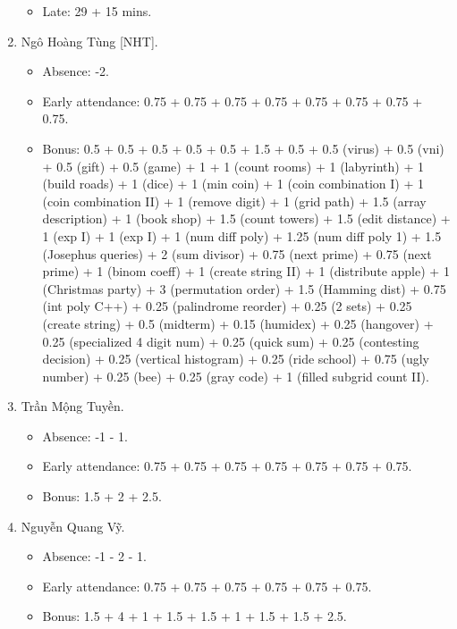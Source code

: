 \documentclass{article}
\begin{document}
\begin{enumerate}
\begin{itemize}
		\item Late: 29 + 15 mins.
	\end{itemize}
	\item {\sc Ngô Hoàng Tùng [NHT].}
	\begin{itemize}
        \item Absence: -2.
		\item Early attendance: 0.75 + 0.75 + 0.75 + 0.75 + 0.75 + 0.75 + 0.75 + 0.75.
		\item Bonus: 0.5 + 0.5 + 0.5 + 0.5 + 0.5 + 1.5 + 0.5 + 0.5 (virus) + 0.5 (vni) + 0.5 (gift) + 0.5 (game) + 1 + 1 (count rooms) + 1 (labyrinth) + 1 (build roads) + 1 (dice) + 1 (min coin) + 1 (coin combination I) + 1 (coin combination II) + 1 (remove digit) + 1 (grid path) + 1.5 (array description) + 1 (book shop) + 1.5 (count towers) + 1.5 (edit distance) + 1 (exp I) + 1 (exp I) + 1 (num diff poly) + 1.25 (num diff poly 1) + 1.5 (Josephus queries) + 2 (sum divisor) + 0.75 (next prime) + 0.75 (next prime) + 1 (binom coeff) + 1 (create string II) + 1 (distribute apple) + 1 (Christmas party) + 3 (permutation order) + 1.5 (Hamming dist) + 0.75 (int poly C++) + 0.25 (palindrome reorder) + 0.25 (2 sets) + 0.25 (create string) + 0.5 (midterm) + 0.15 (humidex) + 0.25 (hangover) + 0.25 (specialized 4 digit num) + 0.25 (quick sum)  + 0.25 (contesting decision) + 0.25 (vertical histogram) + 0.25 (ride school) + 0.75 (ugly number) + 0.25 (bee) + 0.25 (gray code) + 1 (filled subgrid count II).
	\end{itemize}
	\item {\sc Trần Mộng Tuyền.}
	\begin{itemize}
		\item Absence: -1 - 1.
		\item Early attendance: 0.75 + 0.75 + 0.75 + 0.75 + 0.75 + 0.75 + 0.75.
        \item Bonus: 1.5 + 2 + 2.5.
	\end{itemize}
	\item {\sc Nguyễn Quang Vỹ.}
	\begin{itemize}
		\item Absence: -1 - 2 - 1.
		\item Early attendance: 0.75 + 0.75 + 0.75 + 0.75 + 0.75 + 0.75.
		\item Bonus: 1.5 + 4 + 1 + 1.5 + 1.5 + 1 + 1.5 + 1.5 + 2.5.
	\end{itemize}
\end{enumerate}

\end{document}
